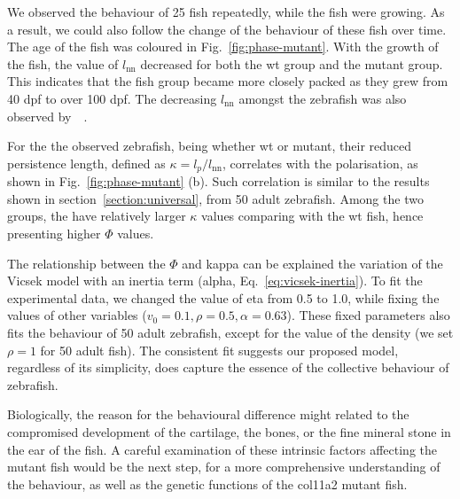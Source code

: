 \documentclass[11pt,twoside]{report}
\begin{document}
We observed the behaviour of 25 fish repeatedly, while the fish were growing. As a result, we could also follow the change of the behaviour of these fish over time. The age of the fish was coloured in Fig.~\ref{fig:phase-mutant}. With the growth of the fish, the value of $l_\mathrm{nn}$ decreased for both the wt group and the mutant group.
This indicates that the fish group became more closely packed as they grew from 40 dpf to over 100 dpf. The decreasing $l_\mathrm{nn}$ amongst the zebrafish was also observed by~\citeauthor{buske2011}~\cite{buske2011}.


For the the observed zebrafish, being whether wt or mutant, their reduced persistence length, defined as $\kappa = l_p / l_\text{nn}$, correlates with the polarisation, as shown in Fig.~\ref{fig:phase-mutant} (b).
Such correlation is similar to the results shown in section~\ref{section:universal}, from 50 adult zebrafish.
Among the two groups, the {\mf} have relatively larger $\kappa$ values comparing with the wt fish, hence presenting higher $\Phi$ values.


The relationship between the $\Phi$ and \gls{kappa} can be explained the variation of the Vicsek model with an inertia term (\gls{alpha}, Eq.~\ref{eq:vicsek-inertia}). To fit the experimental data, we changed the value of \gls{eta} from 0.5 to 1.0, while fixing the values of other variables ($v_0=0.1, \rho=0.5, \alpha=0.63$).
These fixed parameters also fits the behaviour of 50 adult zebrafish, except for the value of the density (we set $\rho=1$ for 50 adult fish).
The consistent fit suggests our proposed model, regardless of its simplicity, does capture the essence of the collective behaviour of zebrafish.

Biologically, the reason for the behavioural difference might related to the compromised development of the cartilage, the bones, or the fine mineral stone in the ear of the fish. A careful examination of these intrinsic factors affecting the mutant fish would be the next step, for a more comprehensive understanding of the behaviour, as well as the genetic functions of the col11a2 mutant fish.
\end{document}
